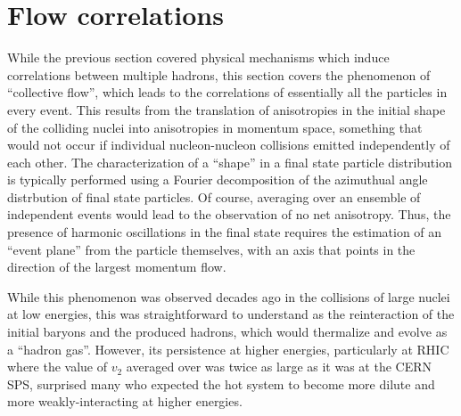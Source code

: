 \section{Flow correlations}
\label{sec:ps:flow}

While the previous section covered physical mechanisms which induce
correlations between multiple hadrons, this section covers the
phenomenon of ``collective flow'', which leads to the correlations of
essentially all the particles in every event.
This results from the translation of anisotropies in the initial shape of the
colliding nuclei into anisotropies in momentum space, something that
would not occur if individual nucleon-nucleon collisions emitted independently
of each other.
The characterization of a ``shape'' in a final state particle distribution
is typically performed using a Fourier decomposition of the azimuthual
angle distrbution of final state particles.
Of course, averaging over an ensemble of independent events would lead to
the observation of no net anisotropy.  Thus, the presence of harmonic
oscillations in the final state requires the estimation of an ``event plane''
from the particle themselves, with an axis that points in the direction of
the largest momentum flow.

While this phenomenon was observed decades ago in the collisions of large
nuclei at low energies, this was straightforward to understand as the
reinteraction of the initial baryons and the produced hadrons, which
would thermalize and evolve as a ``hadron gas''.  
However, its persistence at higher energies, particularly at RHIC where the
value of $v_2$ averaged over \pT was twice as large as it was at the 
CERN SPS, surprised many who expected the hot system to become more
dilute and more weakly-interacting at higher energies.

